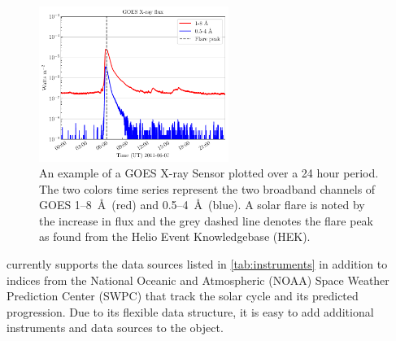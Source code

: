 \begin{figure}
    \centering
    \includegraphics[width=0.55\textwidth]{figures/timeseries_example.pdf}
    \caption{An example of a GOES X-ray Sensor \Timeseries plotted over a 24 hour period. The two colors time series represent the two broadband channels of GOES 1--8~\AA\ (red) and 0.5--4~\AA\ (blue).  A solar flare is noted by the increase in flux and the grey dashed line denotes the flare peak as found from the Helio Event Knowledgebase (HEK).}
    \label{fig:timeseries_example}
\end{figure}

\Timeseries currently supports the data sources listed in \autoref{tab:instruments} in addition to indices from the National Oceanic and Atmospheric (NOAA) Space Weather Prediction Center (SWPC) that track the solar cycle and its predicted progression. Due to its flexible data structure, it is easy to add additional instruments and data sources to the \Timeseries object.


